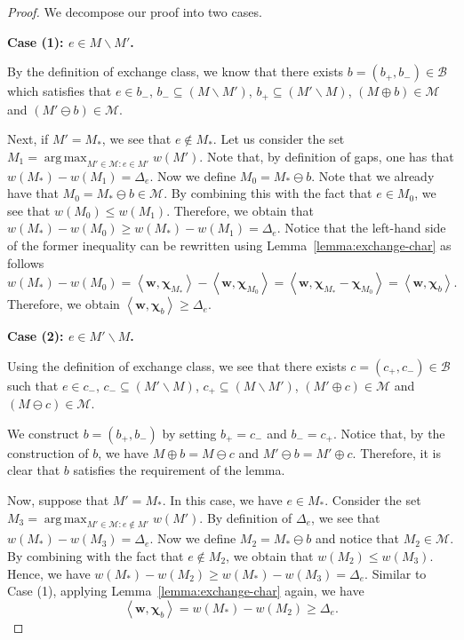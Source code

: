 \documentclass{article}
\newcommand{\M}{\mathcal M}
\newcommand{\B}{\mathcal B}
\newcommand{\del}{\backslash}
\DeclareMathOperator*{\argmax}{arg\,max}
\newcommand{\inn}[1]{\left\langle #1 \right\rangle}
\renewcommand{\vec}[1]{\boldsymbol{#1}}
\begin{document}
\begin{proof}
We decompose our proof into two cases.

\textbf{Case (1): $e\in M\del M'$.}

By the definition of exchange class, we know that 
there exists $b=(b_+, b_-) \in \B$ which satisfies that
$e\in b_-$, $b_- \subseteq (M\del M') $, $b_+\subseteq (M' \del M)$, $(M\oplus b) \in \M$ and $(M'\ominus b) \in \M$.

Next, if $M'=M_*$, we see that $e\not \in M_*$.
Let us consider the set $M_1 = \argmax_{M'\in \M\colon e\in M'} w(M')$.
Note that, by definition of gaps, one has that $w(M_*)-w(M_1) = \Delta_e$.
Now we define $M_0 = M_*\ominus b$. 
Note that we already have that $M_0=M_* \ominus b \in \M$.  
By combining this with the fact that $e\in M_0$, we see that $w(M_0) \le w(M_1)$. 
Therefore, we obtain that
$w(M_*)-w(M_0) \ge w(M_*)-w(M_1) = \Delta_e$.
Notice that the left-hand side of the former inequality can be rewritten using Lemma~\ref{lemma:exchange-char} as follows
$$
w(M_*)-w(M_0) = \inn{\vec w, \vec \chi_{M_*}}-\inn{\vec w, \vec \chi_{M_0}} = \inn{\vec w, \vec \chi_{M_*}-\vec\chi_{M_0}}
= \inn{\vec w,\vec \chi_b}.
$$
Therefore, we obtain $\inn{\vec w,\vec \chi_b} \ge \Delta_e$.

\textbf{Case (2): $e\in M'\del M$.}

Using the definition of exchange class, we see that 
there exists $c=(c_+,c_-)\in \B$ such that 
$e\in c_-$, $c_-\subseteq (M'\del M)$, $c_+\subseteq (M\del M')$, $(M'\oplus c)\in \M$
and $(M\ominus c)\in \M$.

We construct $b=(b_+,b_-)$ by setting $b_+=c_-$ and $b_-=c_+$. 
Notice that, by the construction of $b$, we have $M\oplus b = M\ominus c$ and $M'\ominus b = M'\oplus c$.
Therefore, it is clear that $b$ satisfies the requirement of the lemma.


Now, suppose that $M'=M_*$. 
In this case, we have $e\in M_*$.
Consider the set $M_3 = \argmax_{M'\in \M\colon e\not \in M'} w(M')$.
By definition of $\Delta_e$, we see that $w(M_*)-w(M_3)=\Delta_e$.
Now we define $M_2 = M_* \ominus b$ and notice that  $M_2 \in \M$.
By combining with the fact that $e\not \in M_2$, we obtain that $w(M_2) \le w(M_3)$.
Hence, we have
$w(M_*)-w(M_2) \ge w(M_*)-w(M_3)=\Delta_e$.
Similar to Case (1), applying Lemma~\ref{lemma:exchange-char} again, we have
$$
\inn{\vec w,\vec \chi_b} = w(M_*)-w(M_2) \ge \Delta_e.
$$
\end{proof}
\end{document}
